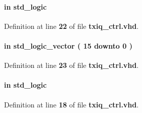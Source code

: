 \paragraph[{pct\+\_\+sync\+\_\+pulse}]{ {\bfseries \textcolor{keywordflow}{in}\textcolor{vhdlchar}{ }} {\bfseries \textcolor{comment}{std\+\_\+logic}\textcolor{vhdlchar}{ }} \hspace{0.3cm}{\ttfamily [Port]}}\label{classtxiq__ctrl_a2c9701133e84a11d18a67bef2ad7afa9}


Definition at line {\bf 22} of file {\bf txiq\+\_\+ctrl.\+vhd}.

\paragraph[{pct\+\_\+sync\+\_\+size}]{ {\bfseries \textcolor{keywordflow}{in}\textcolor{vhdlchar}{ }} {\bfseries \textcolor{comment}{std\+\_\+logic\+\_\+vector}\textcolor{vhdlchar}{ }\textcolor{vhdlchar}{(}\textcolor{vhdlchar}{ }\textcolor{vhdlchar}{ } \textcolor{vhdldigit}{15} \textcolor{vhdlchar}{ }\textcolor{keywordflow}{downto}\textcolor{vhdlchar}{ }\textcolor{vhdlchar}{ } \textcolor{vhdldigit}{0} \textcolor{vhdlchar}{ }\textcolor{vhdlchar}{)}\textcolor{vhdlchar}{ }} \hspace{0.3cm}{\ttfamily [Port]}}\label{classtxiq__ctrl_a1df6b60883589786a63c2811c7f0044d}


Definition at line {\bf 23} of file {\bf txiq\+\_\+ctrl.\+vhd}.

\paragraph[{reset\+\_\+n}]{ {\bfseries \textcolor{keywordflow}{in}\textcolor{vhdlchar}{ }} {\bfseries \textcolor{comment}{std\+\_\+logic}\textcolor{vhdlchar}{ }} \hspace{0.3cm}{\ttfamily [Port]}}\label{classtxiq__ctrl_a446ea52ed8c4a84181a47d9165ce41a5}


Definition at line {\bf 18} of file {\bf txiq\+\_\+ctrl.\+vhd}.

